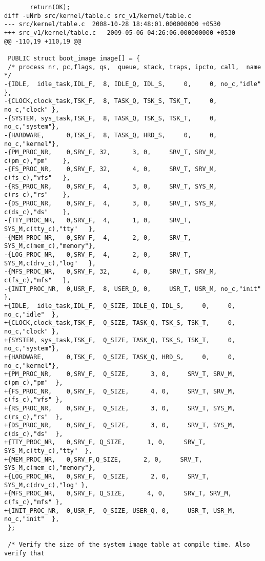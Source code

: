 \begin{verbatim}
       return(OK);
diff -uNrb src/kernel/table.c src_v1/kernel/table.c
--- src/kernel/table.c	2008-10-28 18:48:01.000000000 +0530
+++ src_v1/kernel/table.c	2009-05-06 04:26:06.000000000 +0530
@@ -110,19 +110,19 @@
 
 PUBLIC struct boot_image image[] = {
 /* process nr, pc,flags, qs,  queue, stack, traps, ipcto, call,  name */ 
-{IDLE,  idle_task,IDL_F,  8, IDLE_Q, IDL_S,     0,     0, no_c,"idle"  },
-{CLOCK,clock_task,TSK_F,  8, TASK_Q, TSK_S, TSK_T,     0, no_c,"clock" },
-{SYSTEM, sys_task,TSK_F,  8, TASK_Q, TSK_S, TSK_T,     0, no_c,"system"},
-{HARDWARE,      0,TSK_F,  8, TASK_Q, HRD_S,     0,     0, no_c,"kernel"},
-{PM_PROC_NR,    0,SRV_F, 32,      3, 0,     SRV_T, SRV_M, c(pm_c),"pm"    },
-{FS_PROC_NR,    0,SRV_F, 32,      4, 0,     SRV_T, SRV_M, c(fs_c),"vfs"   },
-{RS_PROC_NR,    0,SRV_F,  4,      3, 0,     SRV_T, SYS_M, c(rs_c),"rs"    },
-{DS_PROC_NR,    0,SRV_F,  4,      3, 0,     SRV_T, SYS_M, c(ds_c),"ds"    },
-{TTY_PROC_NR,   0,SRV_F,  4,      1, 0,     SRV_T, SYS_M,c(tty_c),"tty"   },
-{MEM_PROC_NR,   0,SRV_F,  4,      2, 0,     SRV_T, SYS_M,c(mem_c),"memory"},
-{LOG_PROC_NR,   0,SRV_F,  4,      2, 0,     SRV_T, SYS_M,c(drv_c),"log"   },
-{MFS_PROC_NR,   0,SRV_F, 32,      4, 0,     SRV_T, SRV_M, c(fs_c),"mfs"   },
-{INIT_PROC_NR,  0,USR_F,  8, USER_Q, 0,     USR_T, USR_M, no_c,"init"  },
+{IDLE,  idle_task,IDL_F,  Q_SIZE, IDLE_Q, IDL_S,     0,     0, no_c,"idle"  },
+{CLOCK,clock_task,TSK_F,  Q_SIZE, TASK_Q, TSK_S, TSK_T,     0, no_c,"clock" },
+{SYSTEM, sys_task,TSK_F,  Q_SIZE, TASK_Q, TSK_S, TSK_T,     0, no_c,"system"},
+{HARDWARE,      0,TSK_F,  Q_SIZE, TASK_Q, HRD_S,     0,     0, no_c,"kernel"},
+{PM_PROC_NR,    0,SRV_F,  Q_SIZE,      3, 0,     SRV_T, SRV_M, c(pm_c),"pm"  },
+{FS_PROC_NR,    0,SRV_F,  Q_SIZE,      4, 0,     SRV_T, SRV_M, c(fs_c),"vfs" },
+{RS_PROC_NR,    0,SRV_F,  Q_SIZE,      3, 0,     SRV_T, SYS_M, c(rs_c),"rs"  },
+{DS_PROC_NR,    0,SRV_F,  Q_SIZE,      3, 0,     SRV_T, SYS_M, c(ds_c),"ds"  },
+{TTY_PROC_NR,   0,SRV_F, Q_SIZE,      1, 0,     SRV_T, SYS_M,c(tty_c),"tty"  },
+{MEM_PROC_NR,   0,SRV_F,Q_SIZE,      2, 0,     SRV_T, SYS_M,c(mem_c),"memory"},
+{LOG_PROC_NR,   0,SRV_F,  Q_SIZE,      2, 0,     SRV_T, SYS_M,c(drv_c),"log" },
+{MFS_PROC_NR,   0,SRV_F, Q_SIZE,      4, 0,     SRV_T, SRV_M, c(fs_c),"mfs" },
+{INIT_PROC_NR,  0,USR_F,  Q_SIZE, USER_Q, 0,     USR_T, USR_M, no_c,"init"  },
 };
 
 /* Verify the size of the system image table at compile time. Also verify that
 
\end{verbatim}

